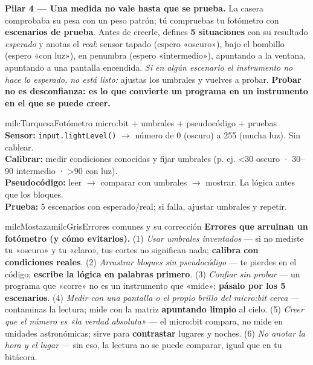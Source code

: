 \documentclass[11pt,letterpaper]{article}
\newcommand{\milcpaso}[3]{%
\Needspace{4\baselineskip}%
\begin{tcolorbox}[enhanced,colback=white,colframe=milcLinea,arc=1.5mm,boxrule=.9pt,
  left=14mm,right=4mm,top=3mm,bottom=3mm,before skip=4pt,after skip=4pt,
  fontupper=\RaggedRight,
  overlay={\node[anchor=north west,circle,fill=#2,text=white,inner sep=0pt,
    minimum size=7.4mm,font=\sffamily\bfseries\small]
    at ([xshift=3.6mm,yshift=-3.2mm]frame.north west) {#1};}]
#3
\end{tcolorbox}}
\begin{document}
\milcpaso{4}{milcTurquesa}{\textbf{Pilar 4 --- Una medida no vale hasta que se prueba.} La casera comprobaba su pesa con un peso patrón; tú compruebas tu fotómetro con \textbf{escenarios de prueba}. Antes de creerle, defines \textbf{5 situaciones} con su resultado \emph{esperado} y anotas el \emph{real}: sensor tapado (espero «oscuro»), bajo el bombillo (espero «con luz»), en penumbra (espero «intermedio»), apuntando a la ventana, apuntando a una pantalla encendida. \emph{Si en algún escenario el instrumento no hace lo esperado, no está listo:} ajustas los umbrales y vuelves a probar. \textbf{Probar no es desconfianza: es lo que convierte un programa en un instrumento en el que se puede creer.}}

\begin{drawbox}{milcTurquesa}{Fotómetro micro:bit + umbrales + pseudocódigo + pruebas}
\textbf{Sensor:} \texttt{input.lightLevel()} $\to$ número de 0 (oscuro) a 255 (mucha luz). Sin cablear. \\[1mm]
\textbf{Calibrar:} medir condiciones conocidas y fijar umbrales (p. ej. <30 oscuro · 30--90 intermedio · >90 con luz). \\[1mm]
\textbf{Pseudocódigo:} leer $\to$ comparar con umbrales $\to$ mostrar. La lógica antes que los bloques. \\[1mm]
\textbf{Prueba:} 5 escenarios con esperado/real; si falla, ajustar umbrales y repetir.
\end{drawbox}

\begin{softbox}{milcMostaza}{milcGris}{Errores comunes y su corrección}
\textbf{Errores que arruinan un fotómetro (y cómo evitarlos).} (1) \emph{Usar umbrales inventados} --- si no mediste tu «oscuro» y tu «claro», tus cortes no significan nada; \textbf{calibra con condiciones reales}. (2) \emph{Arrastrar bloques sin pseudocódigo} --- te pierdes en el código; \textbf{escribe la lógica en palabras primero}. (3) \emph{Confiar sin probar} --- un programa que «corre» no es un instrumento que «mide»; \textbf{pásalo por los 5 escenarios}. (4) \emph{Medir con una pantalla o el propio brillo del micro:bit cerca} --- contaminas la lectura; mide con la matriz \textbf{apuntando limpio} al cielo. (5) \emph{Creer que el número es «la verdad absoluta»} --- el micro:bit compara, no mide en unidades astronómicas; sirve para \textbf{contrastar} lugares y noches. (6) \emph{No anotar la hora y el lugar} --- sin eso, la lectura no se puede comparar, igual que en tu bitácora.
\end{softbox}
\end{document}
